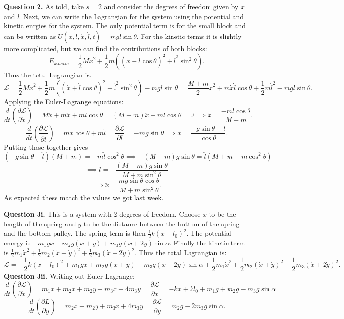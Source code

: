 \documentclass[letterpaper, reqno,11pt]{article}
\begin{document}
{\noindent\bf Question 2.} As told, take $s=2$ and consider the degrees of freedom given by  $x$ and $l$. Next, we can write the Lagrangian for the system using the potential and kinetic enrgies for the system. The only potential term is for the small block and can be written as $U(x, l, \dot x, \dot l, t)=mgl\sin\theta$. For the kinetic terms it is slightly more complicated, but we can find the contributions of both blocks: 
 \[
E_{kinetic}=\frac{1}{2}M\dot x^2+\frac{1}{2}m\left( (\dot x+\dot l\cos\theta)^2+\dot l^2\sin^2\theta \right) 
.\]
Thus the total Lagrangian is: 
\[
\mathcal L=\frac{1}{2}M\dot x^2+\frac{1}{2}m\left( (\dot x+\dot l\cos\theta)^2+\dot l^2\sin^2\theta \right) -mgl\sin\theta=\frac{M+m}{2}\dot x^2+m\dot x\dot l\cos\theta+\frac{1}{2}m\dot l^2-mgl\sin\theta
.\]
Applying the Euler-Lagrange equations: 
\[
\frac{d}{dt}\left( \frac{\partial \mathcal L}{\partial \dot x} \right)=M\ddot x+m\ddot x+m\ddot l\cos\theta=(M+m)\ddot x+m\ddot l\cos\theta=0\implies\ddot x=\frac{-m\ddot l\cos\theta}{M+m}
.\]
\[
\frac{d}{dt}\left( \frac{\partial \mathcal L}{\partial \dot l} \right)=m\ddot x\cos\theta+m\ddot l=\frac{\partial\mathcal L}{\partial l}=-mg\sin\theta\implies \ddot x=\frac{-g\sin\theta-\ddot l}{\cos\theta}
.\]
Putting these together gives
\[
(-g\sin\theta-\ddot l)(M+m)=-m\ddot l\cos^2\theta\implies-(M+m)g\sin\theta=\ddot l(M+m-m\cos^2\theta)
\]
\[
\implies\ddot l=-\frac{(M+m)g\sin\theta}{M+m\sin^2\theta}
\]
\[
\implies \ddot x=\frac{mg\sin\theta\cos\theta}{M+m\sin^2\theta}
.\]
As expected these match the values we got last week. 

{\noindent\bf Question 3i.} This is a system with 2 degrees of freedom. Choose $x$ to be the length of the spring and $y$ to be the distance between the bottom of the spring and the bottom pulley. The spring term is then $\frac{1}{2}k(x-l_0)^2$. The potential energy is $ -m_1 gx-m_2g(x+y)+m_3g(x+2y)\sin\alpha$. Finally the kinetic term is $\frac{1}{2}m_1 \dot x^2+\frac{1}{2}m_2(\dot x+\dot y)^2+\frac{1}{2}m_3 (\dot x+2\dot y)^2$. Thus the total Lagrangian is: 
\[
\mathcal L=-\frac{1}{2}k(x-l_0)^2+m_1 gx+m_2g(x+y)-m_3g(x+2y)\sin\alpha+\frac{1}{2}m_1 \dot x^2+\frac{1}{2}m_2(\dot x+\dot y)^2+\frac{1}{2}m_3 (\dot x+2\dot y)^2
.\]
{\noindent\bf Question 3ii.} Writing out Euler Lagrange: 
\[
\frac{d}{dt}\left( \frac{\partial\mathcal L}{\partial \dot x} \right)=m_1\ddot x+m_2\ddot x+m_2\ddot y+m_3\ddot x+4m_3\ddot y=\frac{\partial\mathcal L}{\partial x}=-kx+kl_0+m_1g+m_2g-m_3g\sin\alpha
\]
\[
\frac{d}{dt}\left( \frac{\partial L}{\partial \dot y} \right) =m_2\ddot x+m_2\ddot y+m_3\ddot x+4m_3\ddot y=\frac{\partial\mathcal L}{\partial y}=m_2g-2m_3g\sin\alpha
.\]
\end{document}

